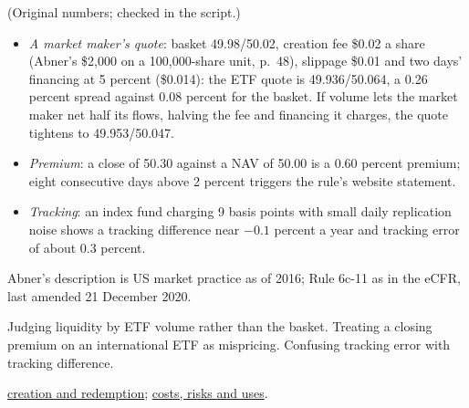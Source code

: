 \begin{qfmethod}
 (Original numbers; checked in the script.)
\begin{itemize}
\item \emph{A market maker's quote}: basket 49.98/50.02, creation fee \$0.02 a share (Abner's \$2,000 on a 100,000-share unit, p.~48), slippage \$0.01 and two days' financing at 5 percent (\$0.014): the ETF quote is 49.936/50.064, a 0.26 percent spread against 0.08 percent for the basket. If volume lets the market maker net half its flows, halving the fee and financing it charges, the quote tightens to 49.953/50.047.
\item \emph{Premium}: a close of 50.30 against a NAV of 50.00 is a 0.60 percent premium; eight consecutive days above 2 percent triggers the rule's website statement.
\item \emph{Tracking}: an index fund charging 9 basis points with small daily replication noise shows a tracking difference near $-0.1$ percent a year and tracking error of about 0.3 percent.
\end{itemize}

 Abner's description is US market practice as of 2016; Rule 6c-11 as in the eCFR, last amended 21 December 2020.

 Judging liquidity by ETF volume rather than the basket. Treating a closing premium on an international ETF as mispricing. Confusing tracking error with tracking difference.

 \hyperref[mech:etf-creation-redemption]{creation and redemption}; \hyperref[meth:etf-costs-risks-uses]{costs, risks and uses}.

\end{qfmethod}

